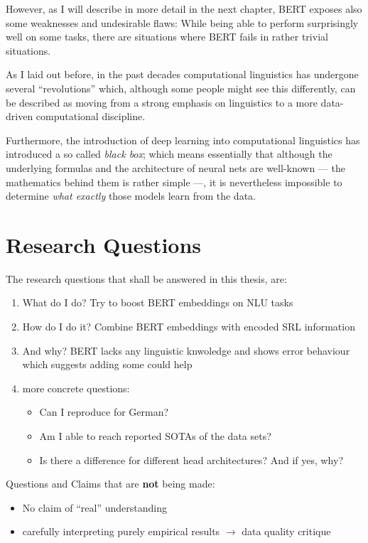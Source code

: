 However, as I will describe in more detail in the next chapter, BERT exposes also
some weaknesses and undesirable flaws: While being able to perform surprisingly well
on some tasks, there are situations where BERT fails in rather trivial situations.

As I laid out before, in the past decades computational linguistics has undergone several
``revolutions'' which, although some people might see this differently, can be described as
moving from a strong emphasis on linguistics to a more data-driven computational discipline.

Furthermore, the introduction of deep learning into computational linguistics has introduced a
so called \emph{black box}; which means essentially that although the underlying formulas and the
architecture of neural nets are well-known --- the mathematics behind them is rather simple ---,
it is nevertheless impossible to determine \emph{what exactly} those models learn from the data.


\section{Research Questions}

The research questions that shall be answered in this thesis, are:
\begin{enumerate}
 \item What do I do? Try to boost BERT embeddings on NLU tasks
 \item How do I do it?  Combine BERT embeddings with encoded SRL information
 \item And why? BERT lacks any linguistic knwoledge and shows error behaviour which suggests adding some could help
 \item more concrete questions:
 \begin{itemize}
    \item Can I reproduce \cite{zhang2019semantics} for German?
    \item Am I able to reach reported SOTAs of the data sets?
    \item Is there a difference for different head architectures? And if yes, why?
 \end{itemize}
\end{enumerate}

Questions and Claims that are \textbf{not} being made:

\begin{itemize}
  \item No claim of ``real'' understanding
  \item carefully interpreting purely empirical results $\rightarrow$ data quality critique
\end{itemize}



